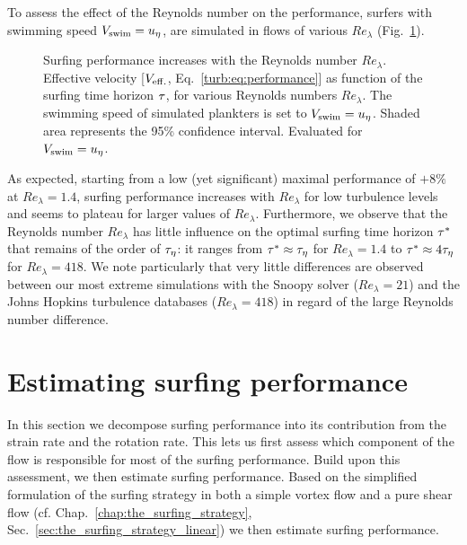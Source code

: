 To assess the effect of the Reynolds number on the performance, surfers with swimming speed $V_{\mathrm{swim}} = u_{\eta}$, are simulated in flows of various $\mathit{Re}_{\lambda}$ (Fig.~\ref{fig:surfing_parameter_tau_reynolds}).
\begin{figure}%
	\centering
	
	\caption[Surfing performance increases with the Reynolds number $\mathit{Re}_{\lambda}$.]{
		Surfing performance increases with the Reynolds number $\mathit{Re}_{\lambda}$.
		Effective velocity [$V_{\mathrm{eff.}}$, Eq.~\eqref{turb:eq:performance}] as function of the surfing time horizon $\tau$, for various Reynolds numbers $\mathit{Re}_{\lambda}$.
		The swimming speed of simulated plankters is set to $V_{\mathrm{swim}} = u_{\eta}$.
		Shaded area represents the 95\% confidence interval.
		Evaluated for $V_{\mathrm{swim}} = u_{\eta}$.
	}
	\label{fig:surfing_parameter_tau_reynolds}
\end{figure}
As expected, starting from a low (yet significant) maximal performance of $+8\%$ at $\mathit{Re}_{\lambda} = 1.4$, surfing performance increases with $\mathit{Re}_{\lambda}$ for low turbulence levels and seems to plateau for larger values of $\mathit{Re}_{\lambda}$.
Furthermore, we observe that the Reynolds number $\mathit{Re}_{\lambda}$ has little influence on the optimal surfing time horizon $\tau^*$ that remains of the order of $\tau_{\eta}$: it ranges from $\tau^* \approx \tau_{\eta}$ for $\mathit{Re}_{\lambda} = 1.4$ to $\tau^* \approx 4\tau_{\eta}$ for $\mathit{Re}_{\lambda} = 418$.
We note particularly that very little differences are observed between our most extreme simulations with the Snoopy solver ($\mathit{Re}_{\lambda} = 21$) and the Johns Hopkins turbulence databases ($\mathit{Re}_{\lambda} = 418$) in regard of the large Reynolds number difference.

\section{Estimating surfing performance}\label{sec:estimating_surfing_performance}

In this section we decompose surfing performance into its contribution from the strain rate and the rotation rate.
This lets us first assess which component of the flow is responsible for most of the surfing performance.
Build upon this assessment, we then estimate surfing performance.
Based on the simplified formulation of the surfing strategy in both a simple vortex flow and a pure shear flow (cf. Chap.~\ref{chap:the_surfing_strategy}, Sec.~\ref{sec:the_surfing_strategy_linear}) we then estimate surfing performance.

